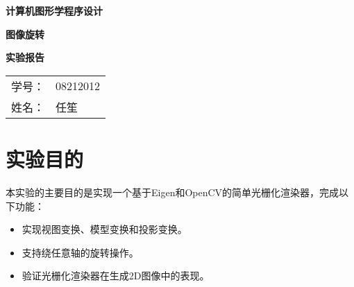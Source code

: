 \documentclass[a4paper,12pt]{article}
\begin{document}
\begin{titlepage}
    \centering
    \vspace*{3cm} %

    {\Huge \textbf{计算机图形学程序设计}\par}
    {\Huge \textbf{图像旋转}\par}
    \vspace{0.5cm}
    {\Huge \textbf{实验报告}\par}

    \vspace{8cm} %

    {\Large
    \begin{tabular}{rl}
        学号： & 08212012 \\
        姓名： & 任笙
    \end{tabular}
    \par}

    \vfill %
\end{titlepage}

\section{实验目的}
本实验的主要目的是实现一个基于Eigen和OpenCV的简单光栅化渲染器，完成以下功能：
\begin{itemize}
    \item 实现视图变换、模型变换和投影变换。
    \item 支持绕任意轴的旋转操作。
    \item 验证光栅化渲染器在生成2D图像中的表现。
\end{itemize}
\end{document}
